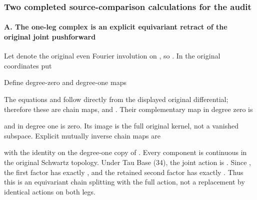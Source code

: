 \subsubsection{Two completed source-comparison calculations for the
audit}\label{two-completed-source-comparison-calculations-for-the-audit}

\paragraph{A. The one-leg complex is an explicit equivariant retract of
the original joint
pushforward}\label{a.-the-one-leg-complex-is-an-explicit-equivariant-retract-of-the-original-joint-pushforward}

Let \protect{} denote the original even Fourier involution on
\protect{}, so \protect{}. In the original coordinates
put


Define degree-zero and degree-one maps


The equations \protect{} and
\protect{} follow directly from the displayed
original differential; therefore these are chain maps, and
\protect{}. Their complementary map in degree zero is


and in degree one is zero. Its image is the full original kernel, not a
vanished subspace. Explicit mutually inverse chain maps are



with the identity on the degree-one copy of \protect{}.
Every component is continuous in the original Schwartz topology. Under
Tau Base (34), the joint action is \protect{}.
Since \protect{}, the first
factor has exactly \protect{}, and the retained second factor
has exactly \protect{}. Thus this is an equivariant chain
splitting with the full action, not a replacement by identical actions
on both legs.


